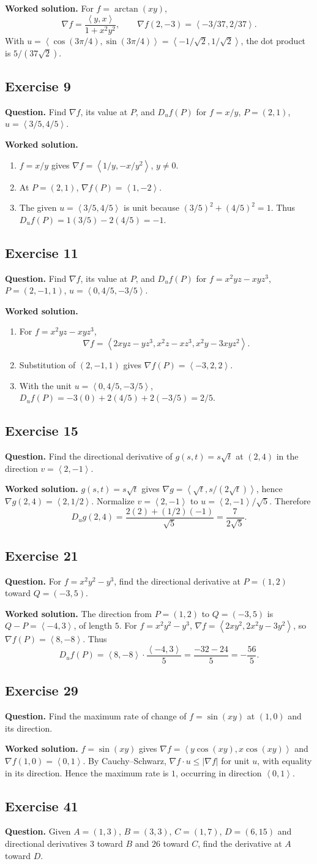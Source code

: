 \documentclass[11pt]{article}
\newcommand{\ex}[1]{\Needspace{8\baselineskip}\subsection*{Exercise #1}}
\newcommand{\ans}[1]{\boxed{#1}}
\newcommand{\vv}[1]{\left\langle #1\right\rangle}
\begin{document}
\textbf{Worked solution.}
For $f=\arctan(xy)$,
\[\nabla f=\frac{\vv{y,x}}{1+x^2y^2},\qquad\nabla f(2,-3)=\vv{-3/37,2/37}.\]
With $u=\vv{\cos(3\pi/4),\sin(3\pi/4)}=\vv{-1/\sqrt2,1/\sqrt2}$, the dot product is $\ans{5/(37\sqrt2)}$.
\ex{9}
\textbf{Question.} Find $\nabla f$, its value at $P$, and $D_uf(P)$ for $f=x/y$, $P=(2,1)$, $u=\vv{3/5,4/5}$.

\textbf{Worked solution.}
\begin{enumerate}[label=(\alph*)]
\item $f=x/y$ gives $\ans{\nabla f=\vv{1/y,-x/y^2}}$, $y\ne0$.
\item At $P=(2,1)$, $\ans{\nabla f(P)=\vv{1,-2}}$.
\item The given $u=\vv{3/5,4/5}$ is unit because $(3/5)^2+(4/5)^2=1$. Thus $D_uf(P)=1(3/5)-2(4/5)=\ans{-1}$.
\end{enumerate}
\ex{11}
\textbf{Question.} Find $\nabla f$, its value at $P$, and $D_uf(P)$ for $f=x^2yz-xyz^3$, $P=(2,-1,1)$, $u=\vv{0,4/5,-3/5}$.

\textbf{Worked solution.}
\begin{enumerate}[label=(\alph*)]
\item For $f=x^2yz-xyz^3$,
\[\ans{\nabla f=\vv{2xyz-yz^3,x^2z-xz^3,x^2y-3xyz^2}}.\]
\item Substitution of $(2,-1,1)$ gives $\ans{\nabla f(P)=\vv{-3,2,2}}$.
\item With the unit $u=\vv{0,4/5,-3/5}$, $D_uf(P)=-3(0)+2(4/5)+2(-3/5)=\ans{2/5}$.
\end{enumerate}
\ex{15}
\textbf{Question.} Find the directional derivative of $g(s,t)=s\sqrt t$ at $(2,4)$ in the direction $v=\vv{2,-1}$.

\textbf{Worked solution.}
$g(s,t)=s\sqrt t$ gives $\nabla g=\vv{\sqrt t,s/(2\sqrt t)}$, hence $\nabla g(2,4)=\vv{2,1/2}$. Normalize $v=\vv{2,-1}$ to $u=\vv{2,-1}/\sqrt5$. Therefore
\[\ans{D_ug(2,4)=\frac{2(2)+(1/2)(-1)}{\sqrt5}=\frac7{2\sqrt5}}.\]
\ex{21}
\textbf{Question.} For $f=x^2y^2-y^3$, find the directional derivative at $P=(1,2)$ toward $Q=(-3,5)$.

\textbf{Worked solution.}
The direction from $P=(1,2)$ to $Q=(-3,5)$ is $Q-P=\vv{-4,3}$, of length $5$. For $f=x^2y^2-y^3$, $\nabla f=\vv{2xy^2,2x^2y-3y^2}$, so $\nabla f(P)=\vv{8,-8}$. Thus
\[\ans{D_uf(P)=\vv{8,-8}\cdot\frac{\vv{-4,3}}5=\frac{-32-24}5=-\frac{56}5}.\]
\ex{29}
\textbf{Question.} Find the maximum rate of change of $f=\sin(xy)$ at $(1,0)$ and its direction.

\textbf{Worked solution.}
$f=\sin(xy)$ gives $\nabla f=\vv{y\cos(xy),x\cos(xy)}$ and $\nabla f(1,0)=\vv{0,1}$. By Cauchy--Schwarz, $\nabla f\cdot u\le|\nabla f|$ for unit $u$, with equality in its direction. Hence the maximum rate is $\ans{1}$, occurring in direction $\ans{\vv{0,1}}$.
\ex{41}
\textbf{Question.} Given $A=(1,3)$, $B=(3,3)$, $C=(1,7)$, $D=(6,15)$ and directional derivatives $3$ toward $B$ and $26$ toward $C$, find the derivative at $A$ toward $D$.
\end{document}
